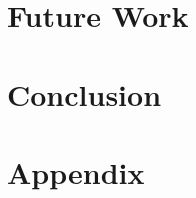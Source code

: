 \documentclass[
	11pt, 
	a4paper, 
	twoside, 
	openright, 
	titlepage=firstiscover, 
	numbers=noenddot, 
	BCOR=12mm,
	headsepline,
	footsepline,
	toc=listof,
	toc=bibliography
	]{scrbook}
\let\cleardoublepage\clearpage
\begin{document}

	
	
	 
	\tableofcontents
	

	
	
	
	
	
	
	
	\chapter{Future Work}
	
	
	\chapter{Conclusion}
	
	
	
\cleardoublepage
{}
	
	\appendix
	
	\chapter{Appendix}
	
	
	
	
	
	\renewcommand{\listtheoremname}{List of Definitions}
	\listoftheorems[ignoreall,show={definition}]
	\listoffigures
	\listoftables
	\renewcommand{\lstlistlistingname}{List of \lstlistingname s}
	\lstlistoflistings	
	\renewcommand{\listtheoremname}{List of Formulas}
	\listoftheorems[ignoreall,show={formula}]
	\printbibliography %
\end{document}
